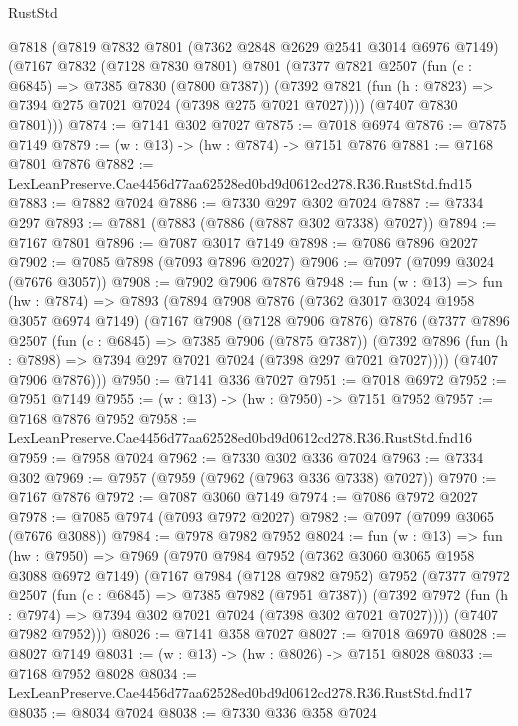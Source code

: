 \begin{lexlean}{RustStd}
\begin{coremodule}
  @7818
    (@7819
      @7832
      @7801
      (@7362 @2848 @2629 @2541 @3014 @6976 @7149)
      (@7167
        @7832
        (@7128 @7830 @7801)
        @7801
        (@7377
          @7821
          @2507
          (fun (c : @6845) => @7385 @7830 (@7800 @7387))
          (@7392 @7821 (fun (h : @7823) => @7394 @275 @7021 @7024 (@7398 @275 @7021 @7027))))
        (@7407 @7830 @7801)))
@7874 := @7141 @302 @7027
@7875 := @7018 @6974
@7876 := @7875 @7149
@7879 := (w : @13) -> (hw : @7874) -> @7151 @7876
@7881 := @7168 @7801 @7876
@7882 := LexLeanPreserve.Cae4456d77aa62528ed0bd9d0612cd278.R36.RustStd.fnd15
@7883 := @7882 @7024
@7886 := @7330 @297 @302 @7024
@7887 := @7334 @297
@7893 := @7881 (@7883 (@7886 (@7887 @302 @7338) @7027))
@7894 := @7167 @7801
@7896 := @7087 @3017 @7149
@7898 := @7086 @7896 @2027
@7902 := @7085 @7898 (@7093 @7896 @2027)
@7906 := @7097 (@7099 @3024 (@7676 @3057))
@7908 := @7902 @7906 @7876
@7948 := fun (w : @13) =>
  fun (hw : @7874) =>
  @7893
    (@7894
      @7908
      @7876
      (@7362 @3017 @3024 @1958 @3057 @6974 @7149)
      (@7167
        @7908
        (@7128 @7906 @7876)
        @7876
        (@7377
          @7896
          @2507
          (fun (c : @6845) => @7385 @7906 (@7875 @7387))
          (@7392 @7896 (fun (h : @7898) => @7394 @297 @7021 @7024 (@7398 @297 @7021 @7027))))
        (@7407 @7906 @7876)))
@7950 := @7141 @336 @7027
@7951 := @7018 @6972
@7952 := @7951 @7149
@7955 := (w : @13) -> (hw : @7950) -> @7151 @7952
@7957 := @7168 @7876 @7952
@7958 := LexLeanPreserve.Cae4456d77aa62528ed0bd9d0612cd278.R36.RustStd.fnd16
@7959 := @7958 @7024
@7962 := @7330 @302 @336 @7024
@7963 := @7334 @302
@7969 := @7957 (@7959 (@7962 (@7963 @336 @7338) @7027))
@7970 := @7167 @7876
@7972 := @7087 @3060 @7149
@7974 := @7086 @7972 @2027
@7978 := @7085 @7974 (@7093 @7972 @2027)
@7982 := @7097 (@7099 @3065 (@7676 @3088))
@7984 := @7978 @7982 @7952
@8024 := fun (w : @13) =>
  fun (hw : @7950) =>
  @7969
    (@7970
      @7984
      @7952
      (@7362 @3060 @3065 @1958 @3088 @6972 @7149)
      (@7167
        @7984
        (@7128 @7982 @7952)
        @7952
        (@7377
          @7972
          @2507
          (fun (c : @6845) => @7385 @7982 (@7951 @7387))
          (@7392 @7972 (fun (h : @7974) => @7394 @302 @7021 @7024 (@7398 @302 @7021 @7027))))
        (@7407 @7982 @7952)))
@8026 := @7141 @358 @7027
@8027 := @7018 @6970
@8028 := @8027 @7149
@8031 := (w : @13) -> (hw : @8026) -> @7151 @8028
@8033 := @7168 @7952 @8028
@8034 := LexLeanPreserve.Cae4456d77aa62528ed0bd9d0612cd278.R36.RustStd.fnd17
@8035 := @8034 @7024
@8038 := @7330 @336 @358 @7024

\end{coremodule}
\end{lexlean}
